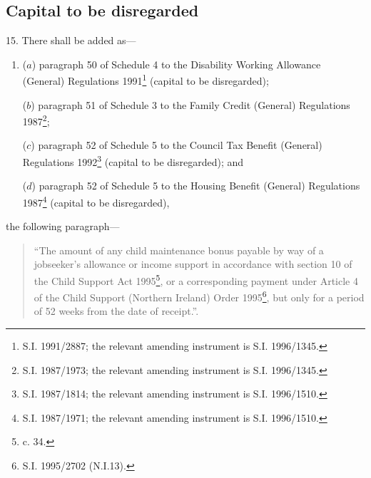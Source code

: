 \documentclass[12pt,a4paper]{article}
\begin{document}

\subsection[15. Capital to be disregarded]{Capital to be disregarded}

15.  There shall be added as—
\begin{enumerate}\item[]
($a$) 
paragraph 50  %
of Schedule 4 to the Disability Working Allowance (General) Regulations 1991\footnote{\frenchspacing S.I. 1991/2887; the relevant amending instrument is S.I. 1996/1345.} (capital to be disregarded);

($b$) 
paragraph 51  %
of Schedule 3 to the Family Credit (General) Regulations 1987\footnote{\frenchspacing S.I. 1987/1973; the relevant amending instrument is S.I. 1996/1345.};

($c$) 
paragraph 52  %
of Schedule 5 to the Council Tax Benefit (General) Regulations 1992\footnote{\frenchspacing S.I. 1987/1814; the relevant amending instrument is S.I. 1996/1510.} (capital to be disregarded); and

($d$) 
paragraph 52  %
of Schedule 5 to the Housing Benefit (General) Regulations 1987\footnote{\frenchspacing S.I. 1987/1971; the relevant amending instrument is S.I. 1996/1510.} (capital to be disregarded),
\end{enumerate}
the following paragraph—
\begin{quotation}
“The amount of any child maintenance bonus payable by way of a jobseeker’s allowance or income support in accordance with section 10 of the Child Support Act 1995\footnote{ c. 34.}, or a corresponding payment under Article 4 of the Child Support (Northern Ireland) Order 1995\footnote{\frenchspacing S.I. 1995/2702 (N.I.13).}, but only for a period of 52 weeks from the date of receipt.”.
\end{quotation}

\end{document}
